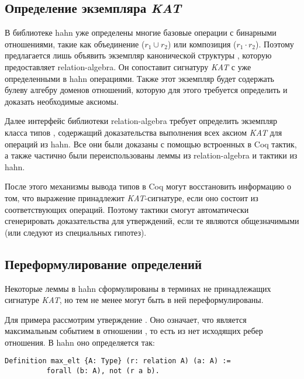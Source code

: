 \documentclass[times
              ,specification
              ,annotation
              ]{itmo-student-thesis}
\begin{document}
    \subsection{Определение экземпляра \textit{KAT}}

      В библиотеке hahn уже определены многие базовые операции с бинарными отношениями, такие как
      объединение ($r_1 \cup r_2$) или композиция ($r_1 \cdot r_2$). Поэтому предлагается
      лишь объявить экземпляр канонической структуры , которую предоставляет
      relation-algebra. Он сопоставит сигнатуру \textit{KAT} с уже определенными в hahn операциями.
      Также этот экземпляр будет содержать булеву алгебру доменов отношений, которую для этого
      требуется определить и доказать необходимые аксиомы.

      Далее интерфейс библиотеки relation-algebra требует определить экземпляр класса типов
      , содержащий доказательства выполнения всех аксиом \textit{KAT} для операций из hahn.
      Все они были доказаны с помощью встроенных в Coq тактик, а также частично были переиспользованы
      леммы из relation-algebra и тактики из hahn.

      После этого механизмы вывода типов в Coq могут восстановить информацию о том, что выражение
      принадлежит \textit{KAT}-сигнатуре, если оно состоит из соответствующих операций.
      Поэтому тактики  смогут автоматически сгенерировать доказательства для
      утверждений, если те являются
      общезначимыми (или следуют из специальных гипотез).

    \subsection{Переформулирование определений}

      Некоторые леммы в hahn сформулированы в терминах не принадлежащих сигнатуре \textit{KAT}, но тем не менее
      могут быть в ней переформулированы.

      Для примера рассмотрим утверждение .
      Оно означает, что  является максимальным событием в отношении , то есть из  нет исходящих
      ребер отношения. В hahn оно определяется так:

      \begin{lstlisting}[gobble=8]
        Definition max_elt {A: Type} (r: relation A) (a: A) :=
          forall (b: A), not (r a b).
      \end{lstlisting}
\end{document}
